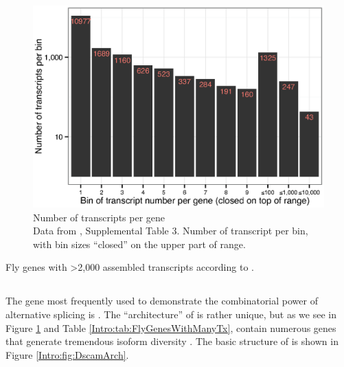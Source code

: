     \begin{figure} %
      \centering 
      \includegraphics{Figures/Intro/NumberOFTranscriptsPerFlyGene.eps}
      \caption[Number of transcripts per \flies{} gene]
      {
        Number of transcripts per \flies{} gene\\[0.25cm]
        Data from \citep{Brown2014}, Supplemental Table 3. Number of transcript per bin, with bin sizes ``closed'' on the upper part of range.
        }
      \label{Intro:fig:txPerFlyGene}
      \end{figure}

    \begin{table} %
      \caption{Fly genes with >2,000 assembled transcripts according to \citep{Brown2014}.}
      \label{Intro:tab:FlyGenesWithManyTx}
      
      \end{table}

  \subsection{\flies{} \dscam{}}
    \label{Intro:subsec:Dscam}

    The gene most frequently used to demonstrate the combinatorial power of alternative splicing is \flies{} \dscam{}. The ``architecture'' of \dscam{} is rather unique, but as we see in Figure \ref{Intro:fig:txPerFlyGene} and Table \ref{Intro:tab:FlyGenesWithManyTx}, \flies{} contain numerous genes that generate tremendous isoform diversity \citep{Brown2014}. The basic structure of \dscam{} is shown in Figure \ref{Intro:fig:DscamArch}.

